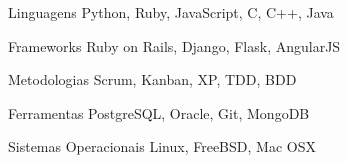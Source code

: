 \documentclass{tccv}
\begin{document}
\begin{factlist}

\item{Linguagens}
     {Python, Ruby, JavaScript, C, C++, Java}
     
\item{Frameworks}
     {Ruby on Rails, Django, Flask, AngularJS}
     
\item{Metodologias}
     {Scrum, Kanban, XP, TDD, BDD}

\item{Ferramentas}
     {PostgreSQL, Oracle, Git, MongoDB}

\item{Sistemas Operacionais}
     {Linux, FreeBSD, Mac OSX}

\end{factlist}
\end{document}
